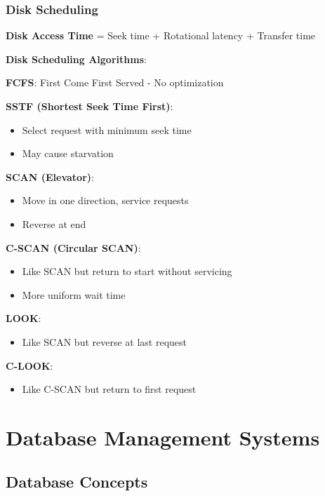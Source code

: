 \documentclass[12pt,a4paper]{report}
\begin{document}
\subsection{Disk Scheduling}
\begin{concept}
\textbf{Disk Access Time} = Seek time + Rotational latency + Transfer time

\textbf{Disk Scheduling Algorithms}:

\textbf{FCFS}: First Come First Served - No optimization

\textbf{SSTF (Shortest Seek Time First)}:
\begin{itemize}
    \item Select request with minimum seek time
    \item May cause starvation
\end{itemize}

\textbf{SCAN (Elevator)}:
\begin{itemize}
    \item Move in one direction, service requests
    \item Reverse at end
\end{itemize}

\textbf{C-SCAN (Circular SCAN)}:
\begin{itemize}
    \item Like SCAN but return to start without servicing
    \item More uniform wait time
\end{itemize}

\textbf{LOOK}:
\begin{itemize}
    \item Like SCAN but reverse at last request
\end{itemize}

\textbf{C-LOOK}:
\begin{itemize}
    \item Like C-SCAN but return to first request
\end{itemize}
\end{concept}

\chapter{Database Management Systems}

\section{Database Concepts}
\end{document}
